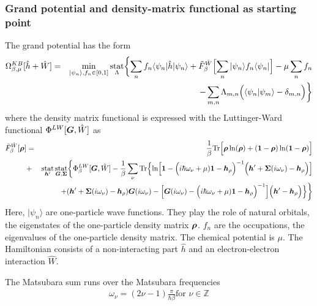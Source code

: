 \documentclass[11pt,a4paper]{report}
\begin{document}
\subsubsection{Grand potential and density-matrix 
functional as starting point}
The grand potential has the form
\begin{eqnarray}
\Omega^{KB}_{\beta,\mu}[\hat{h}+\hat{W}]
&=&\min_{|\psi_n\rangle,f_n\in[0,1]}\operatorname*{stat}_\Lambda
\biggl\lbrace\sum_n f_n\langle\psi_n|\hat{h}|\psi_n\rangle
+\tilde{F}_\beta^{\hat{W}}\Bigl[\sum_n|\psi_n\rangle f_n\langle\psi_n|\Bigr]
-\mu\sum_n f_n\nonumber\\
&&
-\sum_{m,n}\Lambda_{m,n}\Bigl(\langle\psi_n|\psi_m\rangle-\delta_{m,n}\Bigr)
\biggr\rbrace
\label{eq:gcpdm2}
\end{eqnarray}
where the density matrix functional is expressed with the
Luttinger-Ward functional\cite{luttinger60_pr118_1417}
$\Phi^{LW}[\bm{G},\hat{W}]$ as
\begin{eqnarray}
\tilde{F}^{\hat{W}}_\beta[\bm{\rho}]
&=&
\frac{1}{\beta}\mathrm{Tr}\Bigl[
\bm{\rho}\ln(\bm{\rho})+(\bm{1}-\bm{\rho})\ln(\bm{1}-\bm{\rho})\Bigr]
\nonumber\\
&+&
\operatorname*{stat}_{\bm{h}'}\operatorname*{stat}_{\bm{G},\bm{\Sigma}}
\biggl\lbrace
\Phi^{LW}_\beta[\bm{G},\hat{W}]
-\frac{1}{\beta}\sum_\nu\mathrm{Tr}\Bigl\lbrace
\ln\Bigl[
\bm{1}-
\Bigl(i\hbar\omega_\nu+\mu)\bm{1}-\bm{h}_{\rho}\Bigr)^{-1}
\Bigl(\bm{h}'+\bm{\Sigma}(i\omega_\nu)-\bm{h}_{\rho}\Bigr)
\Bigr]
\nonumber\\&&
+(\bm{h}'+\bm{\Sigma}(i\omega_\nu)-\bm{h}_\rho)\bm{G}(i\omega_\nu)
-
\Bigl[
\bm{G}(i\omega_\nu)
-\Bigl(i\hbar\omega_\nu+\mu)\bm{1}-\bm{h}_{\rho}\Bigr)^{-1}
\Bigr]
\Bigl(\bm{h}'-\bm{h}_\rho\Bigr)\Bigr\rbrace
\biggr\rbrace
\label{eq:dmfgreen}
\end{eqnarray}
Here, $|\psi_n\rangle$ are one-particle wave functions. They play the
role of natural orbitals, the eigenstates of the one-particle density
matrix $\bm{\rho}$. $f_n$ are the occupations, the eigenvalues of the
one-particle density matrix. The chemical potential is $\mu$. The
Hamiltonian consists of a non-interacting part $\hat{h}$ and an
electron-electron interaction $\hat{W}$.

The Matsubara sum runs over the Matsubara frequencies 
\begin{eqnarray}
\omega_\nu=(2\nu-1)\frac{\pi}{\hbar\beta}
\text{for $\nu\in\mathbb{Z}$}
\end{eqnarray}
\end{document}
